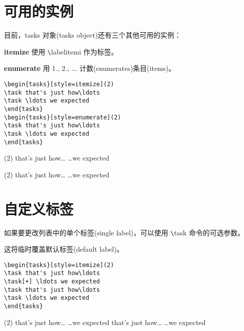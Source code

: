\documentclass[a4paper,12pt,indent]{article}
\begin{document}
\section{可用的实例}

目前，tasks 对象(tasks object)还有三个其他可用的实例：

{\bfseries itemize} 使用 \verb|\|\textcolor{Tasks}{labelitemi} 作为标签。

{\bfseries enumerate} 用 1., 2., ... 计数(enumerates)条目(items)。

\begin{tcolorbox}[collower=black,colframe=Tasks,colback=white]
    \begin{lstlisting}
\begin{tasks}[style=itemize](2)
\task that's just how\ldots
\task \ldots we expected
\end{tasks}
\begin{tasks}[style=enumerate](2)
\task that's just how\ldots
\task \ldots we expected
\end{tasks}
\end{lstlisting}
        \tcblower
        \begin{tasks}[style=itemize](2)
            \task that's just how\ldots
            \task \ldots we expected
        \end{tasks}
        \begin{tasks}[style=enumerate](2)
            \task that's just how\ldots
            \task \ldots we expected
        \end{tasks}       
\end{tcolorbox}


\section{自定义标签}

如果要更改列表中的单个标签(single label)，可以使用 \verb|\|\textcolor{Tasks}{task} 命令的可选参数。

这将临时覆盖默认标签(default label)。


\begin{tcolorbox}[collower=black,colframe=Tasks,colback=white]
    \begin{lstlisting}
\begin{tasks}[style=itemize](2)
\task that's just how\ldots
\task[+] \ldots we expected
\task that's just how\ldots
\task \ldots we expected
\end{tasks}
\end{lstlisting}
        \tcblower
        \begin{tasks}[style=itemize](2)
            \task that's just how\ldots
            \task[+] \ldots we expected
            \task that's just how\ldots
            \task \ldots we expected
            \end{tasks}
           \end{tcolorbox}
\end{document}
